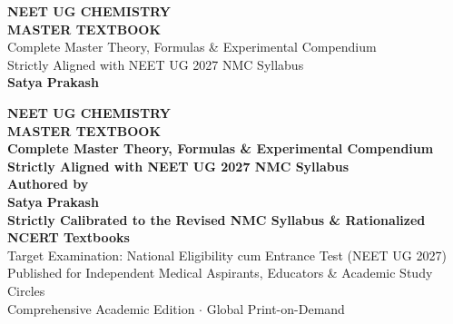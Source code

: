 \documentclass[10pt,twoside,openright]{book}
\begin{document}
\frontmatter

\thispagestyle{empty}
\vspace*{4cm}
\begin{center}
  {\Huge\bfseries\color{primarydark} NEET UG CHEMISTRY}\\[0.6cm]
  {\Large\bfseries\color{accentblue} MASTER TEXTBOOK}\\[1.5cm]
  {\normalsize\color{gray} Complete Master Theory, Formulas \& Experimental Compendium}\\[0.2cm]
  {\normalsize\color{gray} Strictly Aligned with NEET UG 2027 NMC Syllabus}\\[1.5cm]
  {\large\bfseries\color{primarydark} Satya Prakash}
\end{center}
\cleardoublepage

\thispagestyle{empty}
\vspace*{2cm}
\begin{center}
  {\Huge\bfseries\color{primarydark} NEET UG CHEMISTRY}\\[0.4cm]
  {\LARGE\bfseries\color{primarydark} MASTER TEXTBOOK}\\[0.8cm]
  {\Large\bfseries\color{accentblue} Complete Master Theory, Formulas \& Experimental Compendium}\\[0.2cm]
  {\Large\bfseries\color{accentblue} Strictly Aligned with NEET UG 2027 NMC Syllabus}\\[2cm]
  
  {\large\textbf{Authored by}}\\[0.3cm]
  {\LARGE\bfseries\color{primarydark} Satya Prakash}\\[1.5cm]

  {\normalsize\textbf{Strictly Calibrated to the Revised NMC Syllabus \& Rationalized NCERT Textbooks}}\\[0.3cm]
  {\small Target Examination: National Eligibility cum Entrance Test (NEET UG 2027)}\\[2.5cm]

  {\footnotesize Published for Independent Medical Aspirants, Educators \& Academic Study Circles}\\[0.2cm]
  {\footnotesize Comprehensive Academic Edition $\cdot$ Global Print-on-Demand}
\end{center}
\cleardoublepage
\end{document}
